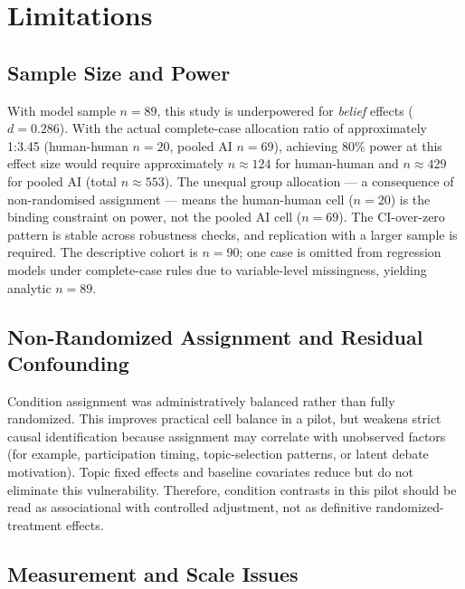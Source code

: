 \pagebreak
\section{Limitations}

\subsection{Sample Size and Power}

With model sample $n = 89$, this study is underpowered for \textit{belief} effects ($d = 0.286$).
With the actual complete-case allocation ratio of approximately 1:3.45 (human-human $n = 20$, pooled AI $n = 69$), achieving 80\% power at this effect size
would require approximately $n \approx 124$ for human-human and $n \approx 429$ for pooled AI (total $n \approx 553$).
The unequal group allocation — a consequence of non-randomised assignment — means the human-human cell ($n = 20$)
is the binding constraint on power, not the pooled AI cell ($n = 69$).
The CI-over-zero pattern is stable across robustness checks, and replication with a larger sample is required.
The descriptive cohort is $n = 90$; one case is omitted from regression models under complete-case
rules due to variable-level missingness, yielding analytic $n = 89$.

\subsection{Non-Randomized Assignment and Residual Confounding}

Condition assignment was administratively balanced rather than fully randomized. This improves
practical cell balance in a pilot, but weakens strict causal identification because assignment may
correlate with unobserved factors (for example, participation timing, topic-selection patterns,
or latent debate motivation). Topic fixed effects and baseline covariates reduce but do not eliminate
this vulnerability. Therefore, condition contrasts in this pilot should be read as associational with
controlled adjustment, not as definitive randomized-treatment effects.

\subsection{Measurement and Scale Issues}

